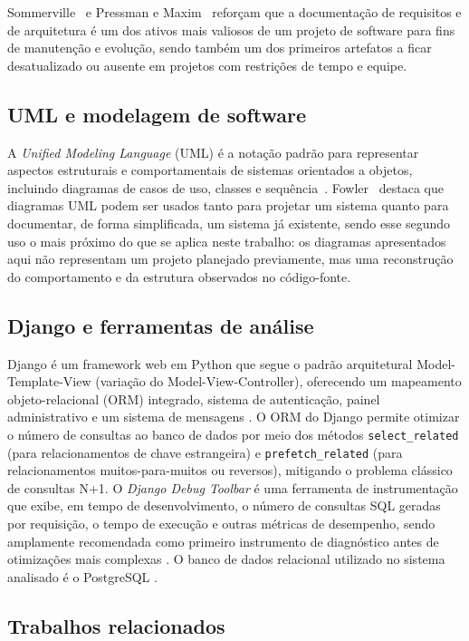 \documentclass[12pt]{article}
\begin{document}
Sommerville~\cite{sommerville2011} e Pressman e Maxim~\cite{pressman2016}
reforçam que a documentação de requisitos e de arquitetura é um dos ativos
mais valiosos de um projeto de software para fins de manutenção e evolução,
sendo também um dos primeiros artefatos a ficar desatualizado ou ausente em
projetos com restrições de tempo e equipe.

\subsection{UML e modelagem de software}

A \emph{Unified Modeling Language} (UML) é a notação padrão para
representar aspectos estruturais e comportamentais de sistemas orientados a
objetos, incluindo diagramas de casos de uso, classes e
sequência~\cite{omg2017,booch2006}. Fowler~\cite{fowler2005} destaca que
diagramas UML podem ser usados tanto para projetar um sistema quanto para
documentar, de forma simplificada, um sistema já existente, sendo esse
segundo uso o mais próximo do que se aplica neste trabalho: os diagramas
apresentados aqui não representam um projeto planejado previamente, mas uma
reconstrução do comportamento e da estrutura observados no código-fonte.

\subsection{Django e ferramentas de análise}

Django é um framework web em Python que segue o padrão arquitetural
Model-Template-View (variação do Model-View-Controller), oferecendo um
mapeamento objeto-relacional (ORM) integrado, sistema de autenticação, painel
administrativo e um sistema de mensagens \cite{django2026}. O ORM do Django
permite otimizar o número de consultas ao banco de dados por meio dos
métodos \texttt{select\_related} (para relacionamentos de chave estrangeira)
e \texttt{prefetch\_related} (para relacionamentos muitos-para-muitos ou
reversos), mitigando o problema clássico de consultas N+1. O
\emph{Django Debug Toolbar} é uma ferramenta de instrumentação que exibe, em
tempo de desenvolvimento, o número de consultas SQL geradas por requisição, o
tempo de execução e outras métricas de desempenho, sendo amplamente
recomendada como primeiro instrumento de diagnóstico antes de otimizações
mais complexas \cite{django2026}. O banco de dados relacional utilizado no
sistema analisado é o PostgreSQL \cite{postgresql2026}.

\subsection{Trabalhos relacionados}
\end{document}

